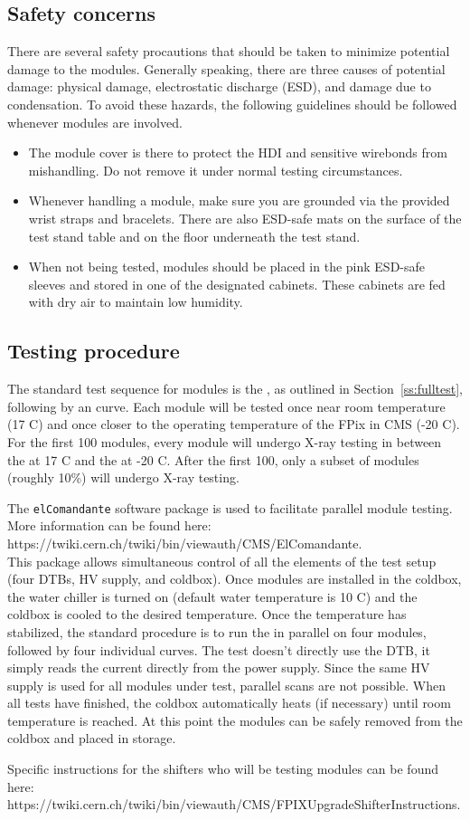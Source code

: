 \subsection{Safety concerns}
\label{ss:safety}

There are several safety procautions that should be taken to minimize potential damage to the modules.
Generally speaking, there are three causes of potential damage: 
physical damage, electrostatic discharge (ESD), and damage due to condensation.
To avoid these hazards, the following guidelines should be followed whenever modules are involved.
\begin{itemize}
\item The module cover is there to protect the HDI and sensitive wirebonds from mishandling.
Do not remove it under normal testing circumstances.
\item Whenever handling a module, make sure you are grounded via the provided wrist straps and bracelets.
There are also ESD-safe mats on the surface of the test stand table and on the floor underneath the test stand.
\item When not being tested, modules should be placed in the pink ESD-safe sleeves and stored in one of the designated cabinets.
These cabinets are fed with dry air to maintain low humidity.
\end{itemize}

\subsection{Testing procedure}
\label{ss:procedure}

The standard test sequence for modules is the \fulltest, as outlined in Section~\ref{ss:fulltest}, following by an \iv curve.
Each module will be tested once near room temperature (17 C) 
and once closer to the operating temperature of the FPix in CMS (-20 C).
For the first 100 modules, every module will undergo X-ray testing in between the \fulltest at 17 C and the \fulltest at -20 C.
After the first 100, only a subset of modules (roughly 10\%) will undergo X-ray testing.

The {\tt elComandante} software package is used to facilitate parallel module testing.
More information can be found here: 
\\
https://twiki.cern.ch/twiki/bin/viewauth/CMS/ElComandante.
\\
This package allows simultaneous control of all the elements of the test setup (four DTBs, HV supply, and coldbox).
Once modules are installed in the coldbox, 
the water chiller is turned on (default water temperature is 10 C) and the coldbox is cooled to the desired temperature.
Once the temperature has stabilized, 
the standard procedure is to run the \fulltest in parallel on four modules, followed by four individual \iv curves.
The \iv test doesn't directly use the DTB, it simply reads the current directly from the power supply.
Since the same HV supply is used for all modules under test, parallel \iv scans are not possible.
When all tests have finished, the coldbox automatically heats (if necessary) until room temperature is reached.
At this point the modules can be safely removed from the coldbox and placed in storage.

Specific instructions for the shifters who will be testing modules can be found here:
\\
https://twiki.cern.ch/twiki/bin/viewauth/CMS/FPIXUpgradeShifterInstructions.

